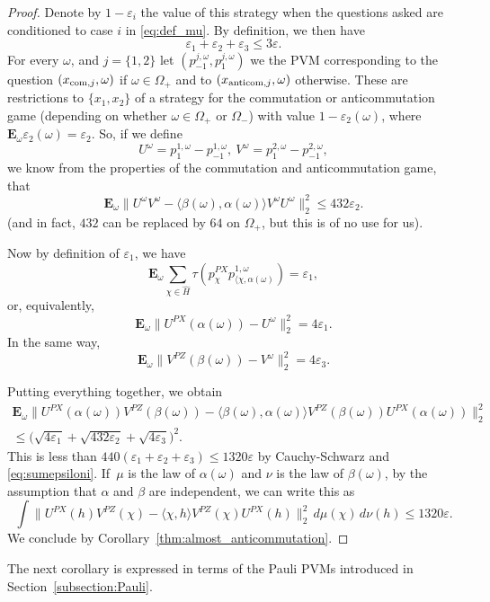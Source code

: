 \documentclass[10pt]{amsart}
\newcommand{\com}{\textup{com}}
\theoremstyle{plain}
\theoremstyle{definition}
\newcommand{\E}{\mathbf{E}}
\newcommand{\anticom}{\textup{anticom}}
\begin{document}
\begin{proof}
Denote by $1-\varepsilon_i$ the value of this strategy when the questions asked are conditioned to case $i$ in \eqref{eq:def_mu}. By definition, we then have
\begin{equation}\label{eq:sumepsiloni} \varepsilon_1+\varepsilon_2+\varepsilon_3\leq 3 \varepsilon.
\end{equation}
For every $\omega$, and $j=\{1,2\}$ let $(p^{j,\omega}_{-1},p^{j,\omega}_{1})$ we the PVM corresponding to the question $(x_{\com,j},\omega)$ if $\omega \in \Omega_+$ and to $(x_{\anticom,j},\omega)$ otherwise. These are restrictions to $\{x_1,x_2\}$ of a strategy for the commutation or anticommutation game (depending on whether $\omega \in \Omega_+$ or $\Omega_-$) with value $1-\varepsilon_2(\omega)$, where $\E_\omega \varepsilon_2(\omega) = \varepsilon_2$. So, if we define
\[
U^{\omega} = p^{1,\omega}_{1}-p^{1,\omega}_{-1},\ V^{\omega} = p^{2,\omega}_{1}-p^{2,\omega}_{-1},
\] we know from the properties of the commutation and anticommutation game, that
\[
\E_\omega \|U^{\omega} V^{\omega} - \langle \beta(\omega), \alpha(\omega)\rangle V^{\omega} U^{\omega}\|_2^2 \leq 432 \varepsilon_2.
\]
(and in fact, $432$ can be replaced by $64$ on $\Omega_+$, but this is of no use for us).

Now by definition of $\varepsilon_1$, we have
\[
\E_\omega \sum_{\chi \in \hat H} \tau(p^{PX}_\chi p^{1,\omega}_{\langle \chi,\alpha(\omega)}) = \varepsilon_1,
\]
or, equivalently,
\[
\E_\omega \| U^{PX}(\alpha(\omega)) - U^\omega\|_2^2 = 4\varepsilon_1.
\]
In the same way,
\[
\E_\omega \| V^{PZ}(\beta(\omega)) - V^\omega\|_2^2 = 4\varepsilon_3.
\]

Putting everything together, we obtain
\begin{multline*} \E_\omega \bigl\|U^{PX}(\alpha(\omega)) V^{PZ}(\beta(\omega)) - \langle \beta(\omega),\alpha(\omega)\rangle V^{PZ}(\beta(\omega)) U^{PX}(\alpha(\omega))\bigr\|_2^2\\ \leq \bigl(\sqrt{4\varepsilon_1} + \sqrt{432 \varepsilon_2}+\sqrt{4\varepsilon_3}\bigr)^2.
\end{multline*}
This is less than $440(\varepsilon_1+\varepsilon_2+\varepsilon_3) \leq 1320\varepsilon$ by Cauchy-Schwarz and \eqref{eq:sumepsiloni}. If~$\mu$ is the law of $\alpha(\omega)$ and $\nu$ is the law of $\beta(\omega)$, by the assumption that $\alpha$ and $\beta$ are independent, we can write this as
\[
\int \bigl\|U^{PX}(h) V^{PZ}(\chi) - \langle \chi,h\rangle V^{PZ}(\chi) U^{PX}(h)\bigr\|_2^2 \,d\mu(\chi) \,d\nu(h) \leq 1320 \varepsilon.
\]
We conclude by Corollary~\ref{thm:almost_anticommutation}.
\end{proof}
The next corollary is expressed in terms of the Pauli PVMs introduced in Section~\ref{subsection:Pauli}.
\end{document}
